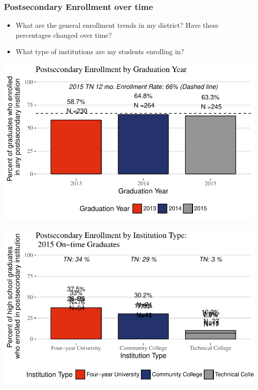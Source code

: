 \documentclass[11pt,]{article}
\providecommand{\tightlist}{%
  \setlength{\itemsep}{0pt}\setlength{\parskip}{0pt}}
\begin{document}
\subsubsection{Postsecondary Enrollment over
time}\label{postsecondary-enrollment-over-time}

\begin{itemize}
\tightlist
\item
  What are the general enrollment trends in my district? Have these
  percentages changed over time?
\item
  What type of institutions are my students enrolling in?
\end{itemize}

\begin{center}\includegraphics{20170517_PSWRR_files/figure-latex/Enrollment over time-1} \end{center}

\begin{center}\includegraphics{20170517_PSWRR_files/figure-latex/District by Type-1} \end{center}
\end{document}
